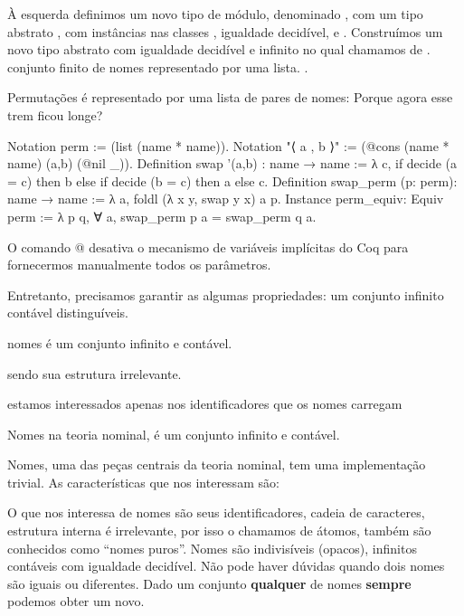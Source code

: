À esquerda definimos um novo tipo de módulo, denominado , com um tipo abstrato , com instâncias nas classes , igualdade decidível, e .
Construímos um novo tipo abstrato  com igualdade decidível  e infinito  no qual chamamos de .  conjunto finito de nomes representado por uma lista. .

Permutações é representado por uma lista de pares de nomes: Porque agora esse trem ficou longe?
\begin{coqcode}
Notation perm := (list (name * name)).
Notation "⟨ a , b ⟩" := (@cons (name * name) (a,b) (@nil _)).
Definition swap '(a,b) : name → name :=
  λ c, if decide (a = c) then b else if decide (b = c) then a else c.
Definition swap_perm (p: perm): name → name :=
  λ a, foldl (λ x y, swap y x) a p.
Instance perm_equiv: Equiv perm :=
  λ p q, ∀ a, swap_perm p a = swap_perm q a.
\end{coqcode}
O comando @ desativa o mecanismo de variáveis implícitas do Coq para fornecermos manualmente todos os parâmetros.




Entretanto, precisamos garantir as algumas propriedades:  um conjunto infinito contável  distinguíveis.

 nomes é um conjunto infinito e contável.

sendo sua estrutura irrelevante.

estamos interessados apenas nos identificadores que os nomes carregam



Nomes na teoria nominal, é um conjunto infinito e contável.

Nomes, uma das peças centrais da teoria nominal, tem uma implementação trivial. As características que nos interessam são:



O que nos interessa de nomes são seus identificadores, cadeia de caracteres, estrutura interna é irrelevante, por isso o chamamos de átomos, também são conhecidos como ``nomes puros''. Nomes são indivisíveis (opacos), infinitos contáveis com igualdade decidível. Não pode haver dúvidas quando dois nomes são iguais ou diferentes. Dado um conjunto \textbf{qualquer} de nomes \textbf{sempre} podemos obter um novo.

